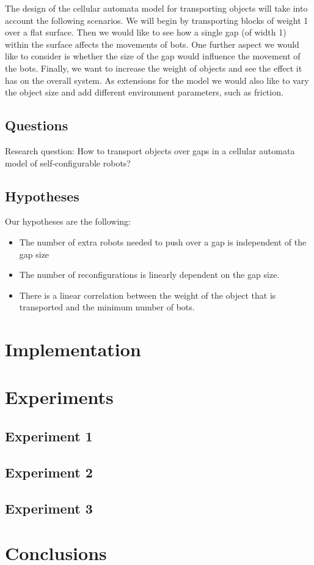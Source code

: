 \documentclass[runningheads]{llncs}
\begin{document}
The design of the cellular automata model for transporting objects will take into account the following scenarios. We will begin by transporting blocks of weight 1 over a flat surface. Then we would like to see how a single gap (of width 1) within the surface affects the movements of bots. One further aspect we would like to consider is whether the size of the gap would influence the movement of the bots. Finally, we want to increase the weight of objects and see the effect it has on the overall system. As extensions for the model we would also like to vary the object size and add different environment parameters, such as friction.

\subsection{Questions}
Research question: How to transport objects over gaps in a cellular automata model of self-configurable robots?

\subsection{Hypotheses}
Our hypotheses are the following:
\begin{itemize}
 \item The number of extra robots needed to push over a gap is independent of the gap size
 \item The number of reconfigurations is linearly dependent on the gap size.
 \item There is a linear correlation between the weight of the object that is transported and the minimum number of bots.
\end{itemize}


\section{Implementation}

\section{Experiments}
\subsection{Experiment 1}

\subsection{Experiment 2}

\subsection{Experiment 3}

\section{Conclusions}



\end{document}
